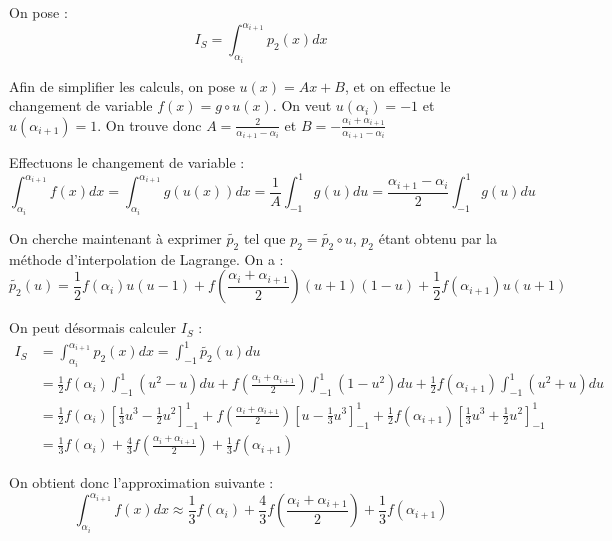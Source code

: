 \documentclass{article}
\newcommand{\tld}[1]{\widetilde{#1}}
\begin{document}
On pose : \[ I_S = \int_{\alpha_i}^{\alpha_{i+1}} p_2(x)dx \]

Afin de simplifier les calculs, on pose $u(x) = Ax+B$, et on effectue le changement de variable $f(x) = g \circ u(x)$. On veut $u(\alpha_i) = -1$ et $u(\alpha_{i+1}) = 1$. On trouve donc $A = \frac{2}{\alpha_{i+1} - \alpha_i}$ et $B = -\frac{\alpha_i + \alpha_{i+1}}{\alpha_{i+1} - \alpha_i}$

Effectuons le changement de variable :
\[ \int_{\alpha_i}^{\alpha_{i+1}} f(x)dx = \int_{\alpha_i}^{\alpha_{i+1}} g(u(x))dx = \frac{1}{A}\int_{-1}^1 g(u)du = \frac{\alpha_{i+1} - \alpha_{i}}{2} \int_{-1}^{1} g(u)du \]

On cherche maintenant à exprimer $\tld{p_2}$ tel que $p_2 = \tld{p_2} \circ u$, $p_2$ étant obtenu par la méthode d'interpolation de Lagrange. On a :
\[ \tld{p_2}(u) = \frac{1}{2}f(\alpha_i)u(u-1) + f\left(\frac{\alpha_i + \alpha_{i+1}}{2}\right)(u+1)(1-u) + \frac{1}{2}f(\alpha_{i+1})u(u+1) \]

On peut désormais calculer $I_S$ :
\[  \begin{aligned}
        I_S & = \int_{\alpha_i}^{\alpha_{i+1}} p_2(x)dx = \int_{-1}^1 \tld{p_2}(u)du \\
            & = \frac{1}{2}f(\alpha_i)\int_{-1}^1 (u^2-u)du + f\left(\frac{\alpha_i+\alpha_{i+1}}{2}\right)\int_{-1}^1 (1-u^2)du + \frac{1}{2}f(\alpha_{i+1})\int_{-1}^1 (u^2+u)du \\
            & = \frac{1}{2}f(\alpha_i)\left[\frac{1}{3}u^3-\frac{1}{2}u^2\right]_{-1}^1
                    + f\left(\frac{\alpha_i+\alpha_{i+1}}{2}\right)\left[u-\frac{1}{3}u^3\right]_{-1}^1
                    + \frac{1}{2}f(\alpha_{i+1})\left[\frac{1}{3}u^3+\frac{1}{2}u^2\right]_{-1}^1 \\
            & = \frac{1}{3}f(\alpha_i) + \frac{4}{3}f\left(\frac{\alpha_i + \alpha_{i+1}}{2}\right) + \frac{1}{3}f(\alpha_{i+1})
    \end{aligned}
\]

On obtient donc l'approximation suivante : \begin{equation}
    \int_{\alpha_i}^{\alpha_{i+1}} f(x)dx \approx \frac{1}{3}f(\alpha_i) + \frac{4}{3}f\left(\frac{\alpha_i + \alpha_{i+1}}{2}\right) + \frac{1}{3}f(\alpha_{i+1})
\end{equation}
\end{document}
